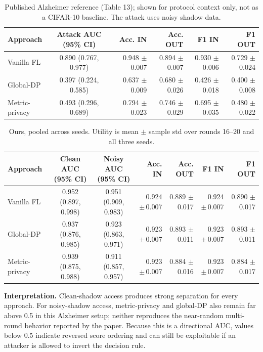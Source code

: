 \documentclass[10pt]{article}
\begin{document}
\begin{table}[h]
\centering
\caption{Published Alzheimer reference (Table 13); shown for protocol context only, not as a CIFAR-10 baseline. The attack uses noisy shadow data.}
\begin{tabular}{lccrrrr}
\toprule
Approach & Attack AUC (95\% CI) & & Acc. IN & Acc. OUT & F1 IN & F1 OUT \\
\midrule
Vanilla FL & 0.890 (0.767, 0.977) & & 0.948 $\pm$ 0.007 & 0.894 $\pm$ 0.007 & 0.930 $\pm$ 0.006 & 0.729 $\pm$ 0.024 \\
Global-DP & 0.397 (0.224, 0.585) & & 0.637 $\pm$ 0.009 & 0.680 $\pm$ 0.026 & 0.426 $\pm$ 0.018 & 0.400 $\pm$ 0.008 \\
Metric-privacy & 0.493 (0.296, 0.689) & & 0.794 $\pm$ 0.023 & 0.746 $\pm$ 0.029 & 0.695 $\pm$ 0.035 & 0.480 $\pm$ 0.022 \\
\bottomrule
\end{tabular}
\end{table}

\begin{table}[h]
\centering
\caption{Ours, pooled across seeds. Utility is mean $\pm$ sample std over rounds 16--20 and all three seeds.}
\begin{tabular}{lccrrrr}
\toprule
Approach & Clean AUC (95\% CI) & Noisy AUC (95\% CI) & Acc. IN & Acc. OUT & F1 IN & F1 OUT \\
\midrule
Vanilla FL & 0.952 (0.897, 0.998) & 0.951 (0.909, 0.983) & 0.924 {\scriptsize$\pm$\,0.007} & 0.889 {\scriptsize$\pm$\,0.017} & 0.924 {\scriptsize$\pm$\,0.007} & 0.890 {\scriptsize$\pm$\,0.017} \\
Global-DP & 0.937 (0.876, 0.985) & 0.923 (0.863, 0.971) & 0.923 {\scriptsize$\pm$\,0.007} & 0.893 {\scriptsize$\pm$\,0.011} & 0.923 {\scriptsize$\pm$\,0.007} & 0.893 {\scriptsize$\pm$\,0.011} \\
Metric-privacy & 0.939 (0.875, 0.988) & 0.911 (0.857, 0.957) & 0.923 {\scriptsize$\pm$\,0.007} & 0.884 {\scriptsize$\pm$\,0.016} & 0.923 {\scriptsize$\pm$\,0.007} & 0.884 {\scriptsize$\pm$\,0.017} \\
\bottomrule
\end{tabular}
\end{table}

\textbf{Interpretation.} Clean-shadow access produces strong separation for every approach.
For noisy-shadow access, metric-privacy and global-DP also remain far above 0.5 in this Alzheimer setup;
neither reproduces the near-random multi-round behavior reported by the paper. Because this is a directional
AUC, values below 0.5 indicate reversed score ordering and can still be exploitable if an attacker is allowed
to invert the decision rule.
\end{document}
